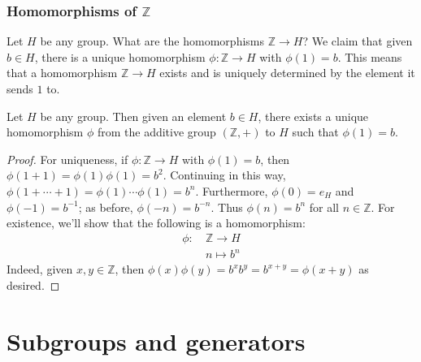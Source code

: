 \documentclass{article}
\theoremstyle{plain}
\newcommand{\Z}{\mathbb{Z}}
\begin{document}
\subsubsection{Homomorphisms of $\Z$}
Let $H$ be any group. What are the homomorphisms $\Z \rightarrow H$? We claim that given $b \in H$, there is a unique homomorphism $\phi : \Z \rightarrow H$ with $\phi(1) = b$. This means that a homomorphism $\Z \rightarrow H$ exists and is uniquely determined by the element it sends $1$ to.
\begin{theorem}{}{}
Let $H$ be any group. Then given an element $b \in H$, there exists a unique homomorphism $\phi$ from the additive group $(\Z,+)$ to $H$ such that $\phi(1) = b$.
\end{theorem}
\begin{proof}
For uniqueness, if $\phi : \Z \rightarrow H$ with $\phi(1) = b$, then $\phi(1 + 1) = \phi(1)\phi(1) = b^2$. Continuing in this way, $\phi(1 + \cdots + 1) = \phi(1) \cdots \phi(1) = b^n$. Furthermore, $\phi(0) = e_H$ and $\phi(-1) = b^{-1}$; as before, $\phi(-n) = b^{-n}$. Thus $\phi(n) = b^n$ for all $n \in \Z$. For existence, we'll show that the following is a homomorphism:
\begin{align*}
\phi : \ &\Z \rightarrow H \\
&n \mapsto b^n
\end{align*}
Indeed, given $x,y \in \Z$, then $\phi(x)\phi(y) = b^xb^y = b^{x+y} = \phi(x+y)$ as desired.
\end{proof}

\section{Subgroups and generators}
\end{document}
